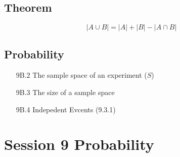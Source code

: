 \documentclass[12pt]{report}
\begin{document}
		\subsection*{Theorem}
		\[ |A \cup B| = |A| + |B| - |A \cap B|  \]
		
		\subsection*{Probability}
		\begin{itemize}
			\item[9B.2] The sample space of an experiment ($S$)
			\item[9B.3] The size of a sample space
			\item[9B.4] Indepedent Evcents (9.3.1)
		\end{itemize}
		\section*{Session 9 Probability}

		
\end{document}
